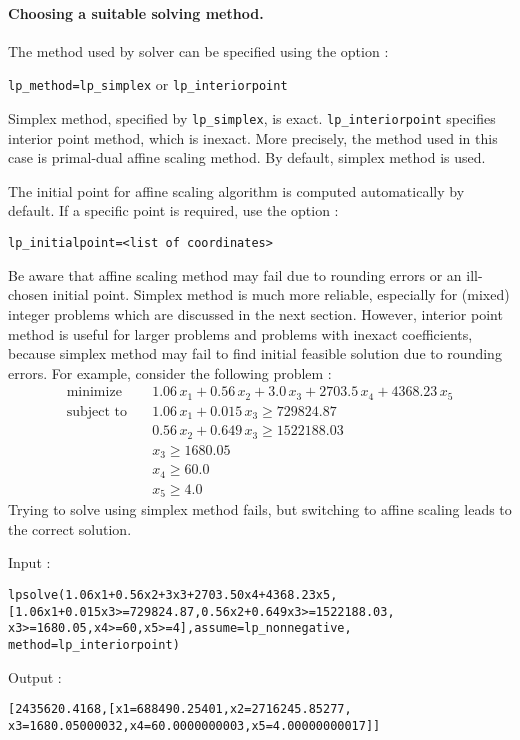 \documentclass[a4paper,11pt]{book}
\begin{document}
\paragraph{Choosing a suitable solving method.}
The method used by solver can be specified using the option :
\begin{center}
{\tt lp\_method=lp\_simplex} or {\tt lp\_interiorpoint}
\end{center}
Simplex method, specified by {\tt lp\_simplex}, is exact. {\tt lp\_interiorpoint} specifies interior point method, which is inexact. More precisely, the method used in this case is primal-dual affine scaling method. By default, simplex method is used. 

The initial point for affine scaling algorithm is computed automatically by default. If a specific point is required, use the option :
\begin{center}
{\tt lp\_initialpoint=<list of coordinates>}
\end{center}
Be aware that affine scaling method may fail due to rounding errors or an ill-chosen initial point. Simplex method is much more reliable, especially for (mixed) integer problems which are discussed in the next section. However, interior point method is useful for larger problems and problems with inexact coefficients, because simplex method may fail to find initial feasible solution due to rounding errors. For example, consider the following problem :
\begin{align*}
\text{minimize}\quad & 1.06\,x_1+0.56\,x_2+3.0\,x_3+2703.5\,x_4+4368.23\,x_5\\
\text{subject to}\quad & 1.06\,x_1+0.015\,x_3 \geq 729824.87\\
& 0.56\,x_2+0.649\,x_3\geq 1522188.03\\
& x_3\geq 1680.05\\
& x_4\geq 60.0\\
& x_5\geq 4.0
\end{align*}
Trying to solve using simplex method fails, but switching to affine scaling leads to the correct solution.

\noindent Input :
\begin{center}
{\tt lpsolve(1.06x1+0.56x2+3x3+2703.50x4+4368.23x5,}
{\tt [1.06x1+0.015x3>=729824.87,0.56x2+0.649x3>=1522188.03,}
{\tt x3>=1680.05,x4>=60,x5>=4],assume=lp\_nonnegative,}
{\tt method=lp\_interiorpoint)}
\end{center}
Output :
\begin{center}
{\tt [2435620.4168,[x1=688490.25401,x2=2716245.85277,}
{\tt x3=1680.05000032,x4=60.0000000003,x5=4.00000000017]]}
\end{center}
\end{document}
